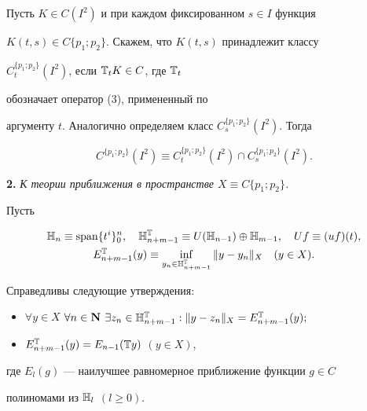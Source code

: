 


Пусть $K\in C(I^2)$ и при каждом фиксированном $s\in I$ функция 


$K(t,s)\in C\{p_1;p_2\}$. Скажем, что $K(t,s)$ принадлежит классу 


$C^{\{p_1;p_2\}}_t(I^2)$, если $\Bbb T_t K\in C$, где $\Bbb T_t$ 


обозначает оператор (3), примененный по 


аргументу $t$. Аналогично определяем класс $C^{\{p_1;p_2\}}_s(I^2)$. Тогда 


$$ 


C^{\{p_1;p_2\}}(I^2)\equiv C^{\{p_1;p_2\}}_t(I^2)\cap 


C^{\{p_1;p_2\}}_s(I^2). 


$$ 





{\bf 2.} {\it К теории приближения в пространстве $X\equiv C\{p_1;p_2\}$.} 


Пусть 


\begin{gather*} 


\Bbb H_n\equiv\Span \{t^i \}^n_0,\quad \Bbb H^{\Bbb T}_{n+m-1}\equiv 


U(\Bbb H_{n-1}\Bbb )\oplus\Bbb H_{m-1},\quad U f\equiv(u f)(t),\\ 


E^{\Bbb T}_{n+m-1}(y)\equiv\inf_{y_n\in\Bbb H^{\Bbb T}_{n+m-1}} 


\|y-y_n\|_X\quad (y\in X). 


\end{gather*} 


 


\begin{thm} 


Справедливы следующие утверждения\/$:$


\begin{itemize} 


\item[(i)] $\forall y\in X$ $\forall n\in \bold N$ $\exists z_n\in \Bbb 


H^{\Bbb T}_{n+m-1}:\|y-z_n\|_X=E^{\Bbb T}_{n+m-1}(y);$ 


\item[(ii)] $E^{\Bbb T}_{n+m-1}(y)=E_{n-1}(\Bbb T y)$ $(y\in X)$, 


\end{itemize} 


где $E_l(g)$ --- наилучшее равномерное приближение функции $g\in C$ 


полиномами из $\Bbb H_l$ $(l\ge0)$. 


\end{thm} 


